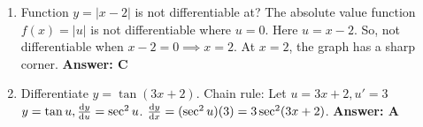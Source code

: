 \begin{enumerate}[label={\arabic*.}]
  \item Function \(y = |x-2|\) is not differentiable at?
    The absolute value function \(f(x)=|u|\) is not differentiable where \(u=0\).
    Here \(u=x-2\). So, not differentiable when \(x-2=0 \implies x=2\).
    At \(x=2\), the graph has a sharp corner.
    \textbf{Answer: C}

  \item Differentiate \(y = \tan(3x+2)\).
    Chain rule: Let \(u=3x+2, u'=3\) \ \(y=\tan u, \frac{\mathrm{d}y}{\mathrm{d}u}=\sec^2 u\).
    \(\frac{\mathrm{d}y}{\mathrm{d}x} = (\sec^2 u)(3) = 3\sec^2(3x+2)\).
    \textbf{Answer: A}

\end{enumerate}
